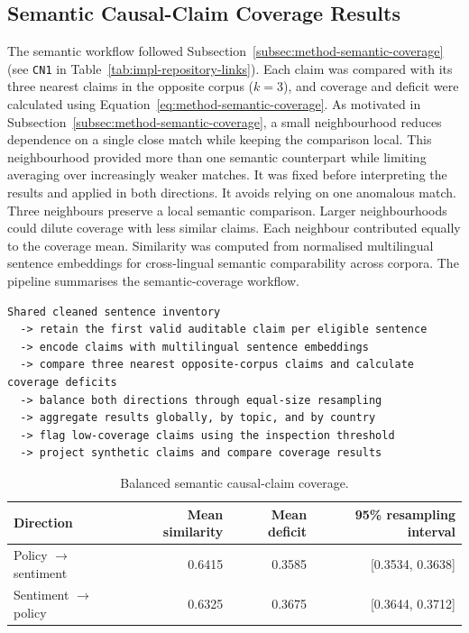 \subsection{Semantic Causal-Claim Coverage Results}
\label{subsec:impl-semantic-coverage}

The semantic workflow followed Subsection~\ref{subsec:method-semantic-coverage} (see
\texttt{CN1} in Table~\ref{tab:impl-repository-links}). Each claim was compared with
its three nearest claims in the opposite corpus (\(k=3\)), and coverage and deficit
were calculated using Equation~\ref{eq:method-semantic-coverage}. As motivated in
Subsection~\ref{subsec:method-semantic-coverage}, a small neighbourhood reduces
dependence on a single close match while keeping the comparison local.
{\color{blue}This neighbourhood provided more than one semantic counterpart while
limiting averaging over increasingly weaker matches. It was fixed before interpreting
the results and applied in both directions. It avoids relying on one anomalous match.
Three neighbours preserve a local semantic comparison. Larger neighbourhoods could
dilute coverage with less similar claims.} Each neighbour contributed equally to the
coverage mean. Similarity was computed from normalised multilingual sentence
embeddings for cross-lingual semantic comparability across corpora. The pipeline
summarises the semantic-coverage workflow.

{\small
\begin{verbatim}
Shared cleaned sentence inventory
  -> retain the first valid auditable claim per eligible sentence
  -> encode claims with multilingual sentence embeddings
  -> compare three nearest opposite-corpus claims and calculate coverage deficits
  -> balance both directions through equal-size resampling
  -> aggregate results globally, by topic, and by country
  -> flag low-coverage claims using the inspection threshold
  -> project synthetic claims and compare coverage results
\end{verbatim}
}

\begin{table}[!htbp]
\centering
\small
\setlength{\tabcolsep}{5pt}
\begin{tabular}{lrrr}
\hline
Direction & Mean similarity & Mean deficit & 95\% resampling interval \\
\hline
Policy $\rightarrow$ sentiment & 0.6415 & 0.3585 & [0.3534, 0.3638] \\
Sentiment $\rightarrow$ policy & 0.6325 & 0.3675 & [0.3644, 0.3712] \\
\hline
\end{tabular}
\caption{Balanced semantic causal-claim coverage.}
\label{tab:impl-semantic-global}
\end{table}


